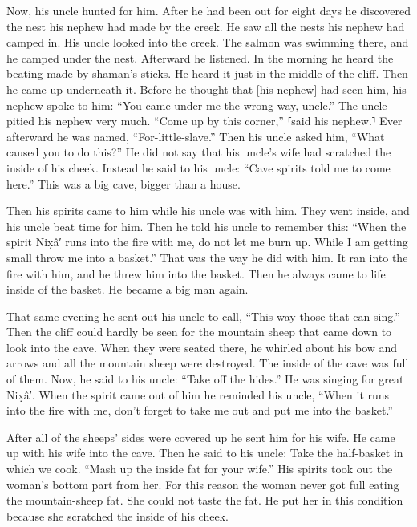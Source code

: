 Now, his uncle hunted for him.
After he had been out for eight days he discovered the nest his nephew had made by the creek.
He saw all the nests his nephew had camped in.
His uncle looked into the creek.
The salmon was swimming there,
and he camped under the nest.
Afterward he listened.
In the morning he heard the beating made by shaman’s sticks.
He heard it just in the middle of the cliff.
Then he came up underneath it.
Before he thought that [his nephew] had seen him, his nephew spoke to him:
\qqk{}“You came under me the wrong way, uncle.”
The uncle pitied his nephew very much.
\qqk{}“Come up by this corner,” ⸢said his nephew.⸣
Ever afterward he was named, “For-little-slave.”
Then his uncle asked him, 
\qqk{}“What caused you to do this?”
He did not say that his uncle’s wife had scratched the inside of his cheek.
Instead he said to his uncle:
“Cave spirits told me to come here.”
This was a big cave, bigger than a house.

Then his spirits came to him while his uncle was with him.
They went inside, and his uncle beat time for him.
Then he told his uncle to remember this:
\qqk{}“When the spirit Nix̣â′ runs into the fire with me, do not let me burn up.
While I am getting small throw me into a basket.” That was the way he did with him.
It ran into the fire with him, and he threw him into the basket.
Then he always came to life inside of the basket.
He became a big man again.

That same evening he sent out his uncle to call,
\qqk{}“This way those that can sing.”
Then the cliff could hardly be seen for the mountain sheep that came down to look into the cave.
When they were seated there, he whirled about his bow and arrows
and all the mountain sheep were destroyed.
The inside of the cave was full of them.
Now, he said to his uncle:
\qqk{}“Take off the hides.”
He was singing for great Nix̣â′.
When the spirit came out of him he reminded his uncle,
“When it runs into the fire with me, don’t forget to take me out and put me into the basket.”

After all of the sheeps’ sides were covered up he sent him for his wife.
He came up with his wife into the cave.
Then he said to his uncle:
Take the half-basket in which we cook.
\qqk{}“Mash up the inside fat for your wife.”
His spirits took out the woman’s bottom part from her.
For this reason the woman never got full eating the mountain-sheep fat.
She could not taste the fat.
He put her in this condition because she scratched the inside of his cheek.

